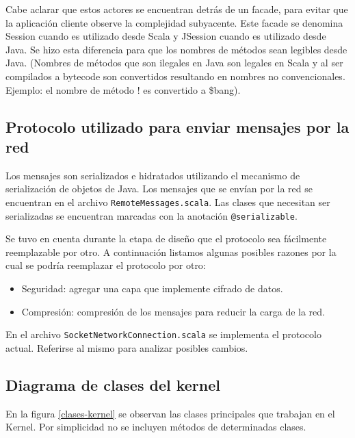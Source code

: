 \documentclass[12pt,a4paper]{article}
\begin{document}
Cabe aclarar que estos actores se encuentran detrás de un facade, para evitar que la aplicación cliente observe la
complejidad subyacente. Este facade se denomina Session cuando es utilizado desde Scala y JSession cuando es utilizado desde Java.
Se hizo esta diferencia para que los nombres de métodos sean legibles desde Java. (Nombres de métodos que son ilegales en Java son
legales en Scala y al ser compilados a bytecode son convertidos resultando en nombres no convencionales. Ejemplo: el nombre de 
método ! es convertido a \$bang).


\subsection{Protocolo utilizado para enviar mensajes por la red}
Los mensajes son serializados e hidratados utilizando el mecanismo de serialización de objetos de Java. Los mensajes que se
envían por la red se encuentran en el archivo
\texttt{RemoteMessages.scala}.
Las clases que necesitan ser serializadas se encuentran marcadas con la anotación \texttt{@serializable}.

Se tuvo en cuenta durante la etapa de diseño que el protocolo sea fácilmente reemplazable por otro. A continuación listamos
algunas posibles razones por la cual se podría reemplazar el protocolo por otro:

\begin{itemize}
	\item Seguridad: agregar una capa que implemente cifrado de datos.
	\item Compresión: compresión de los mensajes para reducir la carga de la red.
\end{itemize}

En el archivo \texttt{SocketNetworkConnection.scala} se implementa
 el protocolo actual. Referirse al mismo para analizar posibles cambios.

\subsection{Diagrama de clases del kernel}
En la figura \ref{clases-kernel} se observan las clases principales que trabajan en el Kernel. Por simplicidad no se 
incluyen métodos de determinadas clases.
\end{document}
